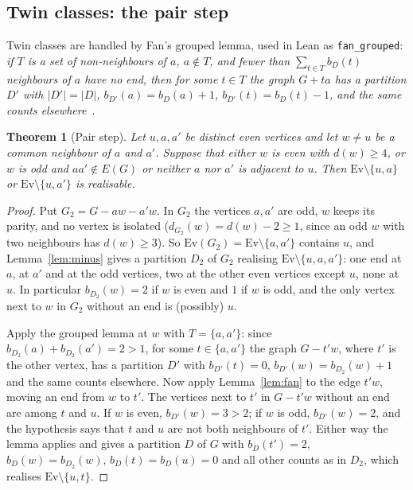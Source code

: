 \documentclass[11pt]{amsart}
\newtheorem{theorem}{Theorem}
\theoremstyle{definition}
\newcommand{\Ev}{\mathrm{Ev}}
\begin{document}
\subsection{Twin classes: the pair step}

Twin classes are handled by Fan's grouped lemma, used in Lean as \texttt{fan\_grouped}: \emph{if
$T$ is a set of non-neighbours of $a$, $a\notin T$, and fewer than $\sum_{t\in T}b_D(t)$ neighbours
of $a$ have no end, then for some $t\in T$ the graph $G+ta$ has a partition $D'$ with $|D'|=|D|$,
$b_{D'}(a)=b_D(a)+1$, $b_{D'}(t)=b_D(t)-1$, and the same counts elsewhere}~\cite[Lemma~3.3]{Fan}.

\begin{theorem}[Pair step]\label{thm:pair}
Let $u,a,a'$ be distinct even vertices and let $w\ne u$ be a common neighbour of $a$ and $a'$.
Suppose that either $w$ is even with $d(w)\ge4$, or $w$ is odd and $aa'\notin E(G)$ or neither $a$
nor $a'$ is adjacent to $u$. Then $\Ev\setminus\{u,a\}$ or $\Ev\setminus\{u,a'\}$ is realisable.
\end{theorem}

\begin{proof}
Put $G_2=G-aw-a'w$. In $G_2$ the vertices $a,a'$ are odd, $w$ keeps its parity, and no vertex is
isolated ($d_{G_2}(w)=d(w)-2\ge1$, since an odd $w$ with two neighbours has $d(w)\ge3$). So
$\Ev(G_2)=\Ev\setminus\{a,a'\}$ contains $u$, and Lemma~\ref{lem:minus} gives a partition $D_2$ of
$G_2$ realising $\Ev\setminus\{u,a,a'\}$: one end at $a$, at $a'$ and at the odd vertices, two at
the other even vertices except $u$, none at $u$. In particular $b_{D_2}(w)=2$ if $w$ is even and
$1$ if $w$ is odd, and the only vertex next to $w$ in $G_2$ without an end is (possibly) $u$.

Apply the grouped lemma at $w$ with $T=\{a,a'\}$: since $b_{D_2}(a)+b_{D_2}(a')=2>1$, for some
$t\in\{a,a'\}$ the graph $G-t'w$, where $t'$ is the other vertex, has a partition $D'$ with
$b_{D'}(t)=0$, $b_{D'}(w)=b_{D_2}(w)+1$ and the same counts elsewhere. Now apply
Lemma~\ref{lem:fan} to the edge $t'w$, moving an end from $w$ to $t'$. The vertices next to $t'$ in
$G-t'w$ without an end are among $t$ and $u$. If $w$ is even, $b_{D'}(w)=3>2$; if $w$ is odd,
$b_{D'}(w)=2$, and the hypothesis says that $t$ and $u$ are not both neighbours of $t'$. Either way
the lemma applies and gives a partition $D$ of $G$ with $b_D(t')=2$, $b_D(w)=b_{D_2}(w)$,
$b_D(t)=b_D(u)=0$ and all other counts as in $D_2$, which realises $\Ev\setminus\{u,t\}$.
\end{proof}
\end{document}
